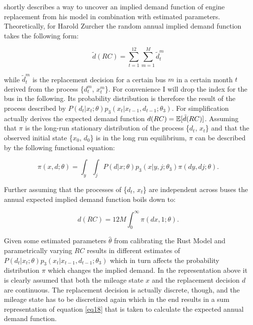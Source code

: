 \cite{Rust.1987} shortly describes a way to uncover an implied demand function of engine replacement from his model in combination with estimated parameters. Theoretically, for Harold Zurcher the random annual implied demand function takes the following form:

\begin{equation*}
	\tilde{d}(RC) = \sum_{t=1}^{12} \sum_{m=1}^{M} \tilde{d}^m_t
\end{equation*}

while $\tilde{d}^m_t$ is the replacement decision for a certain bus $m$ in a certain month $t$ derived from the process \{$d^m_t$, $x^m_t$\}. For convenience I will drop the index for the bus in the following. Its probability distribution is therefore the result of the process described by $P(d_t|x_t; \theta)p_3(x_t|x_{t-1}, d_{t-1}; \theta_3)$. For simplification \citeauthor{Rust.1987} actually derives the expected demand function $d(RC)=\operatorname*{\mathbb{E}}[\tilde{d}(RC)]$. Assuming that $\pi$ is the long-run stationary distribution of the process \{$d_t$, $x_t$\} and that the observed initial state \{$x_0$, $d_0$\} is in the long run equilibrium, $\pi$ can be described by the following functional equation:

\begin{equation}
	\label{eq18}
	\pi(x, d; \theta) = \int_{y} \int_{j} P(d|x; \theta)p_3(x|y, j; \theta_3) \pi(dy, dj; \theta).
\end{equation}

Further assuming that the processes of \{$d_t$, $x_t$\} are independent across buses the annual expected implied demand function boils down to:

\begin{equation}
	\label{eq19}
	d(RC) = 12 M \int_{0}^{\infty} \pi(dx, 1; \theta).
\end{equation}

Given some estimated parameters $\hat\theta$ from calibrating the Rust Model and parametrically varying $RC$ results in different estimates of $P(d_t|x_t; \theta)p_3(x_t|x_{t-1}, d_{t-1}; \theta_3)$ which in turn affects the probability distribution $\pi$ which changes the implied demand. In the representation above it is clearly assumed that both the mileage state $x$ and the replacement decision $d$ are continuous. The replacement decision is actually discrete, though, and the mileage state has to be discretized again which in the end results in a sum representation of equation \ref{eq18} that is taken to calculate the expected annual demand function.
\paragraph{}

